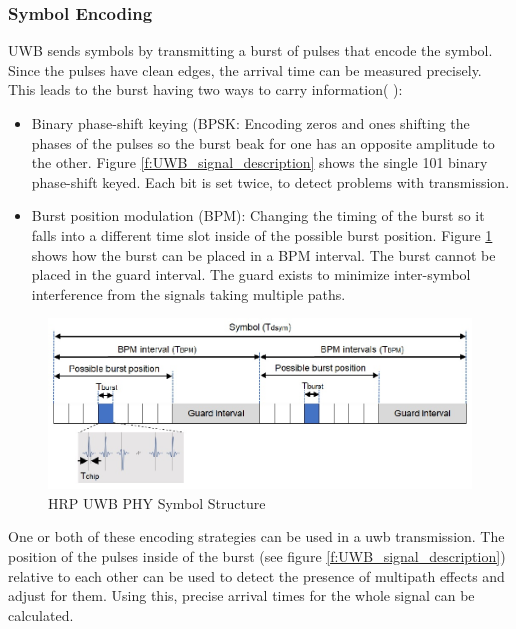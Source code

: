\subsubsection{Symbol Encoding}
UWB sends symbols by transmitting a burst of pulses that encode the symbol.
Since the pulses have clean edges, the arrival time can be measured precisely.
This leads to the burst having two ways to carry information( \cite{QorvoGettingBacktoBasics}):
\begin{itemize}
  \item Binary phase-shift keying (BPSK: Encoding zeros and ones shifting the phases of the pulses so the burst beak for one has an opposite amplitude to the other. 
Figure \ref{f:UWB_signal_description} shows the single 101 binary phase-shift keyed. 
Each bit is set twice, to detect problems with transmission.
  \item Burst position modulation (BPM): Changing the timing of the burst so it falls into a different time slot inside of the possible burst position.	
Figure \ref{f:symbol structure} shows how the burst can be placed in a BPM interval. 
The burst cannot be placed in the guard interval. 
The guard exists to minimize inter-symbol interference from the
signals taking multiple paths.
\end{itemize}

\begin{figure}[ht!]
	\centering
	\includegraphics[width=\linewidth]{graphics/HRP_UWB_PHY_symbol_structure.jpg}
	\caption{HRP UWB PHY Symbol Structure \cite{hsu_2021}}
	\label{f:symbol structure}
\end{figure}

One or both of these encoding strategies can be used in a uwb transmission.
The position of the pulses inside of the burst (see figure \ref{f:UWB_signal_description})  relative to each other can be used to detect the presence of multipath effects and adjust for them. 
Using this, precise arrival times for the whole signal can be calculated.

